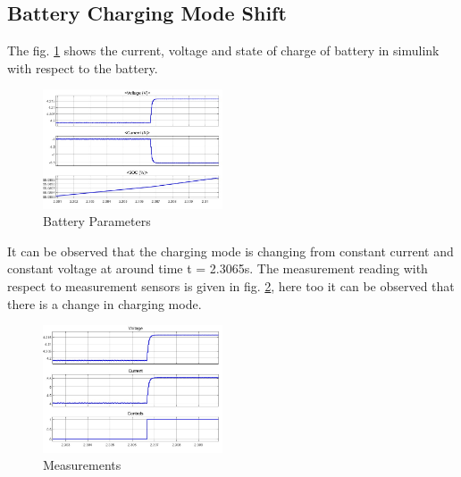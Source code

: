 \documentclass[conference]{IEEEtran}
\begin{document}
\subsection{Battery Charging Mode Shift}
\hspace{0.5cm}The fig. \ref{battery_parameters} shows the current, voltage and state of charge of battery in simulink with respect to the battery.\newline
\begin{figure}[htbp]
    \centering
    \includegraphics[width=0.474\textwidth]{images/battery_params.jpeg}
    \caption{Battery Parameters}
    \label{battery_parameters}
\end{figure}
\hspace{0.5cm} It can be observed that the charging mode is changing from constant current and constant voltage at around time t = 2.3065s. The measurement reading with respect to measurement sensors is given in fig. \ref{measurement_block}, here too it can be observed that there is a change in charging mode.
\begin{figure}[htbp]
    \centering
    \includegraphics[width=0.475\textwidth]{images/measurement_block.jpeg}
    \caption{Measurements}
    \label{measurement_block}
\end{figure}
\end{document}
